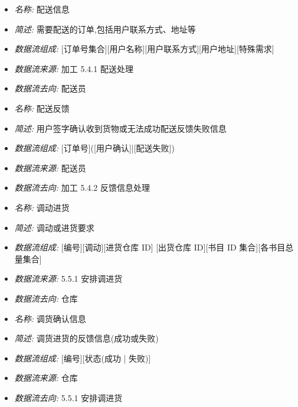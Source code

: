 \documentclass{article}
\begin{document}
\begin{CJK*}{UTF8}{gbsn}
\begin{itemize}
\end{itemize}


\vspace{-1mm}


\begin{itemize}
\item \textit{名称: }配送信息
\item \textit{简述: }需要配送的订单,包括用户联系方式、地址等 
\item \textit{数据流组成: }[订单号集合][用户名称][用户联系方式][用户地址][特殊需求] 
\item \textit{数据流来源: }加工 5.4.1 配送处理
\item \textit{数据流去向: }配送员

\end{itemize}


\vspace{-1mm}


\begin{itemize}
\item \textit{名称: }配送反馈 
\item \textit{简述: }用户签字确认收到货物或无法成功配送反馈失败信息 
\item \textit{数据流组成: }[订单号]([用户确认]|[配送失败]) 
\item \textit{数据流来源: }配送员
\item \textit{数据流去向: }加工 5.4.2 反馈信息处理

\end{itemize}


\vspace{-1mm}


\begin{itemize}
\item \textit{名称: }调动进货
\item \textit{简述: }调动或进货要求
\item \textit{数据流组成: }[编号][调动][进货仓库 ID] [出货仓库 ID][书目 ID 集合][各书目总量集合] 
\item \textit{数据流来源: }5.5.1 安排调进货
\item \textit{数据流去向: }仓库

\end{itemize}


\vspace{-1mm}


\begin{itemize}
\item \textit{名称: }调货确认信息
\item \textit{简述: } 调货进货的反馈信息(成功或失败) 
\item \textit{数据流组成: }[编号][状态(成功 | 失败)] 
\item \textit{数据流来源: }仓库
\item \textit{数据流去向: }5.5.1 安排调进货


\end{itemize}
\end{CJK*}
\end{document}
